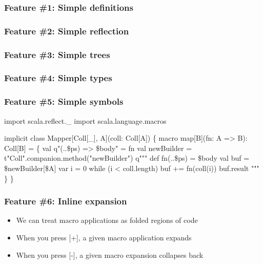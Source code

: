 \documentclass[svgnames,dvipsnames,hyperref={bookmarks=false}]{beamer}
\begin{document}
\begin{frame}[fragile]
\frametitle<1>{Feature \#1: Simple definitions}
\frametitle<2>{Feature \#2: Simple reflection}
\frametitle<3>{Feature \#3: Simple trees}
\frametitle<4>{Feature \#4: Simple types}
\frametitle<5>{Feature \#5: Simple symbols}

\begin{semiverbatim}\small{
\alert<2>{import scala.reflect._}
import scala.language.macros

implicit class Mapper[Coll[_], A](coll: Coll[A]) \{
  \alert<1>{macro map[B](fn: A => B): Coll[B]} = \{
    val \alert<3>{q"(..\$ps) => \$body"} = fn
    val newBuilder = \alert<5>{\alert<2>{\alert<4>{t"Coll"}.companion.method("newBuilder")}}
    \alert<3>{q"""
      \alert<5>{def fn(..\$ps) = \$body}
      val buf = \$newBuilder[\alert<4>{\$A}]
      var i = 0
      while (i < coll.length) buf += fn(coll(i))
      buf.result
    """}
  \}
\}}
\end{semiverbatim}

\begin{itemize}
\end{itemize}
\end{frame}

\begin{frame}[fragile]
\frametitle{Feature \#6: Inline expansion}
\begin{itemize}
\item We can treat macro applications as folded regions of code
\item When you press [+], a given macro application expands
\item When you press [-], a given macro expansion collapses back
\end{itemize}
\end{frame}
\end{document}
